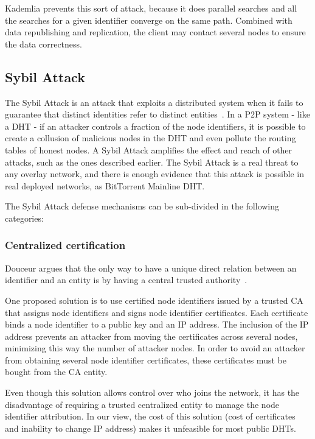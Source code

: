 Kademlia prevents this sort of attack, because it does parallel searches and all the searches for a given identifier converge on the same path. Combined with data republishing and replication, the client may contact several nodes to ensure the data correctness.

\subsection{Sybil Attack}


The Sybil Attack is an attack that exploits a
distributed system when it fails to guarantee that distinct identities refer to
distinct entities~\cite{Douceur2002}.
In a \ac{P2P} system - like a \ac{DHT} - if an attacker
controls a fraction of the node identifiers, it is possible to create a collusion
of malicious nodes in the \ac{DHT} and even pollute the routing tables of honest
nodes.
A Sybil Attack amplifies the effect and reach of other attacks, such as the ones described earlier.
The Sybil Attack is a real threat to any overlay network, and there is enough evidence that this attack is possible in real deployed networks, as BitTorrent Mainline \ac{DHT}\cite{Wang2012}.

The Sybil Attack defense mechanisms can be sub-divided in the following categories:

\subsubsection{Centralized certification}
Douceur argues that the only way to have a unique direct relation between an
identifier and an entity is by having a central trusted authority~\cite{Douceur2002}.

One proposed solution is to use certified node identifiers\cite{Castro2002} issued by a trusted \ac{CA} that assigns node identifiers and signs node identifier certificates.
Each certificate binds a node identifier to a public key and an IP address.
The inclusion of the IP address prevents an attacker from moving the certificates across several nodes, minimizing this way the number of attacker nodes.
In order to avoid an attacker from obtaining several node identifier certificates, these certificates must be bought from the \ac{CA} entity.

Even though this solution allows control over who joins the network, it has the disadvantage of requiring a trusted centralized entity to manage the node identifier attribution.
In our view, the cost of this solution (cost of certificates and inability to change IP address) makes it unfeasible for most public \acp{DHT}.

